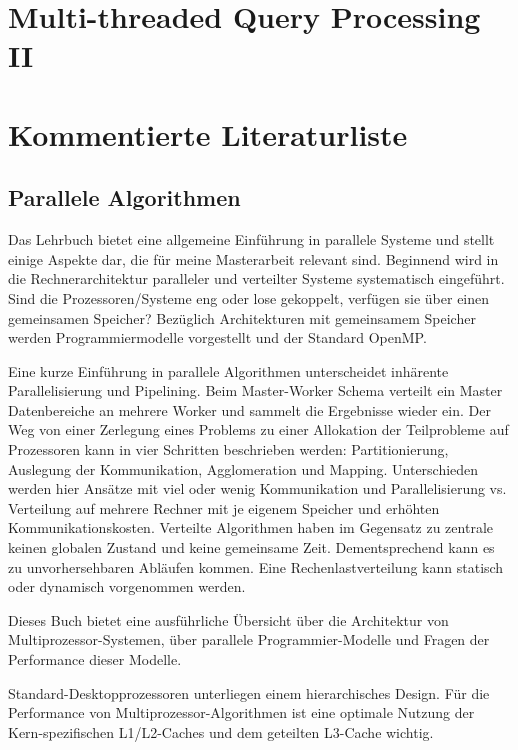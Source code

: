 \documentclass[a4paper,12pt,twoside]{article}
\begin{document}
\section*{Multi-threaded Query Processing II}

\section{Kommentierte Literaturliste}

\subsection{Parallele Algorithmen}

\textbf{}

Das Lehrbuch bietet eine allgemeine Einführung in parallele Systeme und stellt einige Aspekte dar, die für meine Masterarbeit relevant sind.  Beginnend wird in die Rechnerarchitektur paralleler und verteilter Systeme systematisch eingeführt. Sind die Prozessoren/Systeme eng oder lose gekoppelt, verfügen sie über einen gemeinsamen Speicher? Bezüglich Architekturen mit gemeinsamem Speicher werden Programmiermodelle vorgestellt und der Standard OpenMP.

Eine kurze Einführung in parallele Algorithmen unterscheidet inhärente Parallelisierung und Pipelining. Beim Master-Worker Schema verteilt ein Master Datenbereiche an mehrere Worker und sammelt die Ergebnisse wieder ein. Der Weg von einer Zerlegung eines Problems zu einer Allokation der Teilprobleme auf Prozessoren kann in vier Schritten beschrieben werden: Partitionierung, Auslegung der Kommunikation, Agglomeration und Mapping. Unterschieden werden hier Ansätze mit viel oder wenig Kommunikation und Parallelisierung vs. Verteilung auf mehrere Rechner mit je eigenem Speicher und erhöhten Kommunikationskosten. Verteilte Algorithmen haben im Gegensatz zu zentrale keinen globalen Zustand und keine gemeinsame Zeit. Dementsprechend kann es zu unvorhersehbaren Abläufen kommen. Eine Rechenlastverteilung kann statisch oder dynamisch vorgenommen werden. 

\textbf{}

Dieses Buch bietet eine ausführliche Übersicht über die Architektur von Multiprozessor-Systemen, über parallele Programmier-Modelle und Fragen der Performance dieser Modelle.

Standard-Desktopprozessoren unterliegen einem hierarchisches Design. Für die Performance von Multiprozessor-Algorithmen ist eine optimale Nutzung der Kern-spezifischen L1/L2-Caches und dem geteilten L3-Cache wichtig. 
\end{document}
